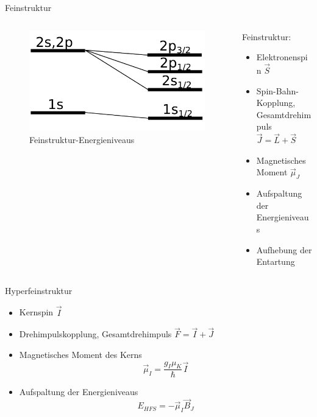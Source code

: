 \documentclass{beamer}
\begin{document}
\begin{frame}{Feinstruktur}
\begin{columns}
\begin{column}{4.5cm}
	\begin{figure}[H]
	\centering \includegraphics[width=\textwidth]{Bilder/Feinstruktur.pdf}
	\caption{Feinstruktur-Energieniveaus}
	\end{figure}
\end{column}
\begin{column}{5.5cm}
Feinstruktur:
\begin{itemize}
	\item Elektronenspin $\vec S$
	\item Spin-Bahn-Kopplung, Gesamtdrehimpuls $\vec J = \vec L + \vec S$
	\item Magnetisches Moment $\vec\mu_J$
	\item Aufspaltung der Energieniveaus
	\item Aufhebung der Entartung
\end{itemize}
\end{column}
\end{columns}
\end{frame}


\begin{frame}{Hyperfeinstruktur}
\begin{itemize}
\item Kernspin $\vec I$
\item Drehimpulskopplung, Gesamtdrehimpuls $\vec F = \vec I + \vec J$
\item Magnetisches Moment des Kerns $$\vec \mu_I = \frac{g_I\mu_K}{\hbar} \vec I $$
\item Aufspaltung der Energieniveaus $$E_{HFS} = -\vec\mu_I\vec B_J$$
\end{itemize}
\end{frame}
\end{document}

